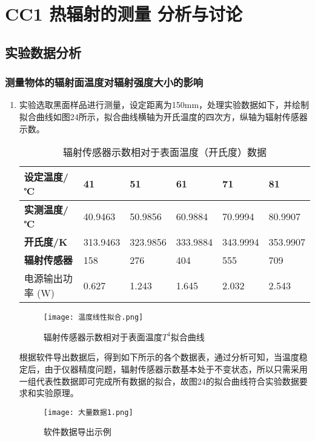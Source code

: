 \documentclass[dvipsnames, svgnames,a4paper,11pt]{article}
\begin{document}
	\section{CC1 热辐射的测量 \quad\heiti 分析与讨论}
	
	\subsection{实验数据分析}
	
	\subsubsection{测量物体的辐射面温度对辐射强度大小的影响}
	\begin{enumerate}
		\item 实验选取黑面样品进行测量，设定距离为150mm，处理实验数据如下，并绘制拟合曲线如图24所示，拟合曲线横轴为开氏温度的四次方，纵轴为辐射传感器示数。
		\begin{table}[H]
			\centering
			\caption{辐射传感器示数相对于表面温度（开氏度）数据}
			\begin{tabular}{|l|l|l|l|l|l|}
			\hline
				\textbf{设定温度/℃} & 41 & 51 & 61 & 71 & 81  \\ \hline
				\textbf{实测温度/℃} & 40.9463 & 50.9856 & 60.9884 & 70.9994 & 80.9907  \\ \hline
				\textbf{开氏度/K} & 313.9463 & 323.9856 & 333.9884 & 343.9994 & 353.9907   \\ \hline
				\textbf{辐射传感器} & 158 & 276 & 404 & 555 & 709  \\ \hline
				电源输出功率 (W) & 0.627 & 1.243 & 1.645 & 2.032 & 2.543 \\\hline
			\end{tabular}
		\end{table}
		\begin{figure}[{H}]
			\centering
			\texttt{[image: 温度线性拟合.png]}
			\caption{辐射传感器示数相对于表面温度$T^4$拟合曲线}
		\end{figure}
	\indent 根据软件导出数据后，得到如下所示的各个数据表，通过分析可知，当温度稳定后，由于仪器精度问题，辐射传感器示数基本处于不变状态，所以只需采用一组代表性数据即可完成所有数据的拟合，故图24的拟合曲线符合实验数据要求和实验原理。
\begin{figure}[{H}]
	\centering
	\texttt{[image: 大量数据1.png]}
	\caption{软件数据导出示例}
	\label{}
\end{figure}
\begin{figure}[{H}]

\end{figure}
\end{enumerate}
\end{document}
